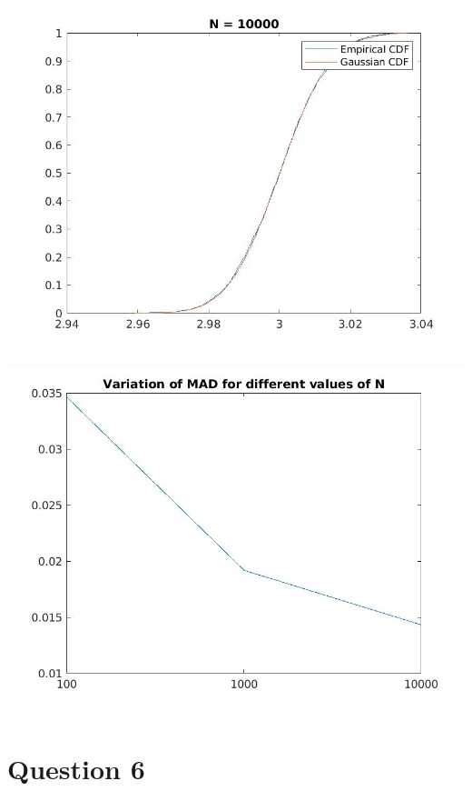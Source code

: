 \documentclass{article}
\theoremstyle{remark}
\begin{document}
\includegraphics[width=\textwidth, height=\textheight, keepaspectratio]{p2_10000.jpg}\par
\includegraphics[width=\textwidth, height=\textheight, keepaspectratio]{p3.jpg}\par
\section{Question 6}
\end{document}
